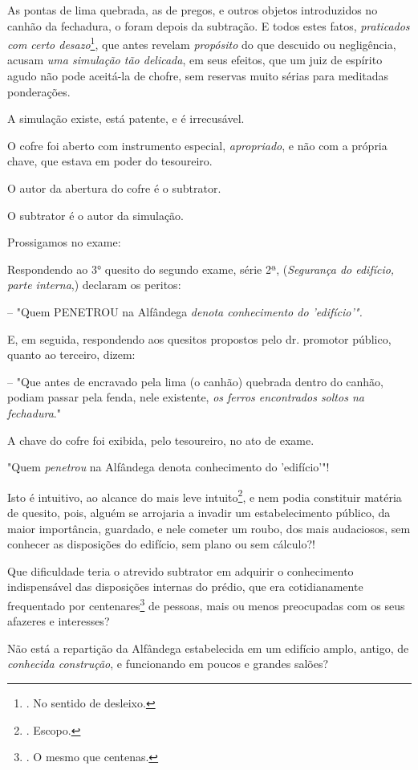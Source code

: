 As pontas de lima quebrada, as de pregos, e outros objetos introduzidos
no canhão da fechadura, o foram depois da subtração. E todos estes
fatos, \emph{praticados com certo desazo}\footnote{. No sentido de
  desleixo.}, que antes revelam \emph{propósito} do que descuido ou
negligência, acusam \emph{uma simulação tão delicada}, em seus efeitos,
que um juiz de espírito agudo não pode aceitá-la de chofre, sem reservas
muito sérias para meditadas ponderações.

A simulação existe, está patente, e é irrecusável.

O cofre foi aberto com instrumento especial, \emph{apropriado}, e não
com a própria chave, que estava em poder do tesoureiro.

O autor da abertura do cofre é o subtrator.

O subtrator é o autor da simulação.

Prossigamos no exame:

Respondendo ao 3° quesito do segundo exame, série 2ª, (\emph{Segurança
do edifício, parte interna},) declaram os peritos:

-- "Quem PENETROU na Alfândega \emph{denota conhecimento do
'edifício'".}

E, em seguida, respondendo aos quesitos propostos pelo dr. promotor
público, quanto ao terceiro, dizem:

-- "Que antes de encravado pela lima (o canhão) quebrada dentro do
canhão, podiam passar pela fenda, nele existente, \emph{os ferros
encontrados soltos na fechadura}."

A chave do cofre foi exibida, pelo tesoureiro, no ato de exame.

"Quem \emph{penetrou} na Alfândega denota conhecimento do 'edifício'"!

Isto é intuitivo, ao alcance do mais leve intuito\footnote{. Escopo.}, e
nem podia constituir matéria de quesito, pois, alguém se arrojaria a
invadir um estabelecimento público, da maior importância, guardado, e
nele cometer um roubo, dos mais audaciosos, sem conhecer as disposições
do edifício, sem plano ou sem cálculo?!

Que dificuldade teria o atrevido subtrator em adquirir o conhecimento
indispensável das disposições internas do prédio, que era cotidianamente
frequentado por centenares\footnote{. O mesmo que centenas.} de pessoas,
mais ou menos preocupadas com os seus afazeres e interesses?

Não está a repartição da Alfândega estabelecida em um edifício amplo,
antigo, de \emph{conhecida construção}, e funcionando em poucos e
grandes salões?

